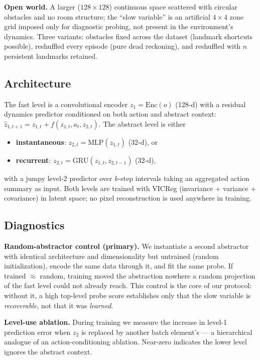\documentclass[11pt]{article}
\begin{document}
\textbf{Open world.} A larger ($128\times128$) continuous space scattered with circular obstacles and no room structure; the ``slow variable'' is an artificial $4\times4$ zone grid imposed only for diagnostic probing, not present in the environment's dynamics. Three variants: obstacles fixed across the dataset (landmark shortcuts possible), reshuffled every episode (pure dead reckoning), and reshuffled with $n$ persistent landmarks retained.

\subsection{Architecture}

The fast level is a convolutional encoder $z_1 = \text{Enc}(o)$ (128-d) with a residual dynamics predictor conditioned on both action and abstract context: $\hat z_{1,t+1} = z_{1,t} + f(z_{1,t}, a_t, z_{2,t})$. The abstract level is either

\begin{itemize}
\item \textbf{instantaneous}: $z_{2,t} = \text{MLP}(z_{1,t})$ (32-d), or
\item \textbf{recurrent}: $z_{2,t} = \text{GRU}(z_{1,t}, z_{2,t-1})$ (32-d),
\end{itemize}

with a jumpy level-2 predictor over $k$-step intervals taking an aggregated action summary as input. Both levels are trained with VICReg \citep{bardes2021vicreg} (invariance + variance + covariance) in latent space; no pixel reconstruction is used anywhere in training.

\subsection{Diagnostics}

\textbf{Random-abstractor control (primary).} We instantiate a second abstractor with identical architecture and dimensionality but untrained (random initialization), encode the same data through it, and fit the same probe. If trained $\approx$ random, training moved the abstraction nowhere a random projection of the fast level could not already reach. This control is the core of our protocol: without it, a high top-level probe score establishes only that the slow variable is \emph{recoverable}, not that it was \emph{learned}.

\textbf{Level-use ablation.} During training we measure the increase in level-1 prediction error when $z_2$ is replaced by another batch element's --- a hierarchical analogue of an action-conditioning ablation. Near-zero indicates the lower level ignores the abstract context.
\end{document}
